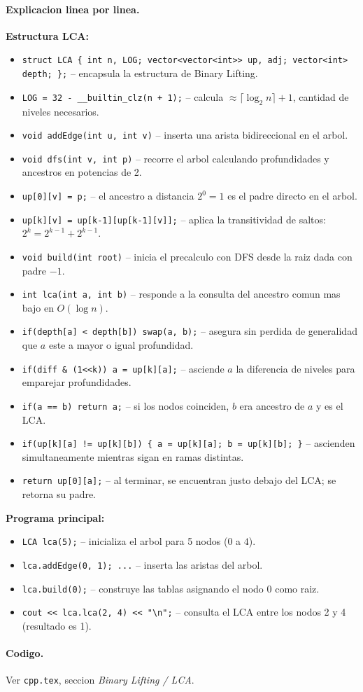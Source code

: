 \paragraph{Explicacion linea por linea.}
\textbf{Estructura LCA:}
\begin{itemize}\setlength\itemsep{0pt}
	\item \verb|struct LCA { int n, LOG; vector<vector<int>> up, adj; vector<int> depth; };| -- encapsula la estructura de Binary Lifting.
	\item \verb|LOG = 32 - __builtin_clz(n + 1);| -- calcula $\approx \lceil \log_2 n \rceil + 1$, cantidad de niveles necesarios.
	\item \verb|void addEdge(int u, int v)| -- inserta una arista bidireccional en el arbol.
	\item \verb|void dfs(int v, int p)| -- recorre el arbol calculando profundidades y ancestros en potencias de 2.
	\item \verb|up[0][v] = p;| -- el ancestro a distancia $2^0 = 1$ es el padre directo en el arbol.
	\item \verb|up[k][v] = up[k-1][up[k-1][v]];| -- aplica la transitividad de saltos: $2^k = 2^{k-1} + 2^{k-1}$.
	\item \verb|void build(int root)| -- inicia el precalculo con DFS desde la raiz dada con padre $-1$.
	\item \verb|int lca(int a, int b)| -- responde a la consulta del ancestro comun mas bajo en $O(\log n)$.
	\item \verb|if(depth[a] < depth[b]) swap(a, b);| -- asegura sin perdida de generalidad que $a$ este a mayor o igual profundidad.
	\item \verb|if(diff & (1<<k)) a = up[k][a];| -- asciende $a$ la diferencia de niveles para emparejar profundidades.
	\item \verb|if(a == b) return a;| -- si los nodos coinciden, $b$ era ancestro de $a$ y es el LCA.
	\item \verb|if(up[k][a] != up[k][b]) { a = up[k][a]; b = up[k][b]; }| -- ascienden simultaneamente mientras sigan en ramas distintas.
	\item \verb|return up[0][a];| -- al terminar, se encuentran justo debajo del LCA; se retorna su padre.
\end{itemize}
\textbf{Programa principal:}
\begin{itemize}\setlength\itemsep{0pt}
	\item \verb|LCA lca(5);| -- inicializa el arbol para 5 nodos ($0$ a $4$).
	\item \verb|lca.addEdge(0, 1); ...| -- inserta las aristas del arbol.
	\item \verb|lca.build(0);| -- construye las tablas asignando el nodo $0$ como raiz.
	\item \verb|cout << lca.lca(2, 4) << "\n";| -- consulta el LCA entre los nodos 2 y 4 (resultado es 1).
\end{itemize}

\paragraph{Codigo.}
Ver \texttt{cpp.tex}, seccion \textit{Binary Lifting / LCA}.

\vspace{0.5em}

